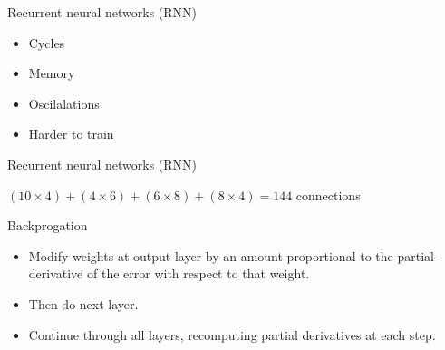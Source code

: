 \begin{frame}{Recurrent neural networks (RNN)}
  \begin{itemize}
  \item Cycles
  \item Memory
  \item Oscilalations
  \item Harder to train
  \end{itemize}
\end{frame}

\begin{frame}{Recurrent neural networks (RNN)}
\end{frame}

\begin{frame}
\end{frame}

\begin{frame}
\end{frame}

\begin{frame}
  \centerline{$(10\times 4) + (4\times 6) + (6\times 8) + (8\times 4) = 144$ connections}
\end{frame}

\begin{frame}{}
  \vspace{5mm}
    
  
\end{frame}

\begin{frame}{Backprogation}
  \begin{itemize}
  \item Modify weights at output layer by an amount proportional to
    the partial-derivative of the error with respect to that weight.
  \item Then do next layer.
  \item Continue through all layers, recomputing partial derivatives at each step.
  \end{itemize}
  
\end{frame}

